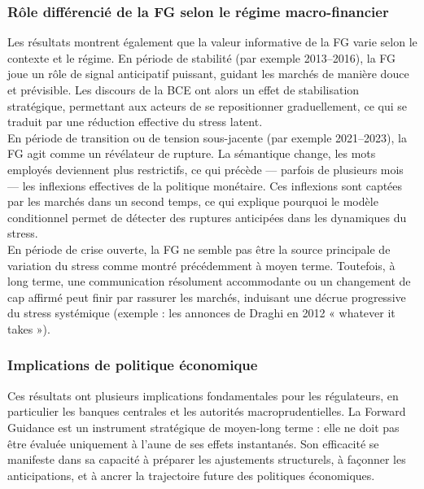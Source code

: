 \subsubsection{Rôle différencié de la FG selon le régime macro-financier}

Les résultats montrent également que la valeur informative de la FG varie selon le contexte et le régime. En période de stabilité (par exemple 2013–2016), la FG joue un rôle de signal anticipatif puissant, guidant les marchés de manière douce et prévisible. Les discours de la BCE ont alors un effet de stabilisation stratégique, permettant aux acteurs de se repositionner graduellement, ce qui se traduit par une réduction effective du stress latent.\\

En période de transition ou de tension sous-jacente (par exemple 2021–2023), la FG agit comme un révélateur de rupture. La sémantique change, les mots employés deviennent plus restrictifs, ce qui précède — parfois de plusieurs mois — les inflexions effectives de la politique monétaire. Ces inflexions sont captées par les marchés dans un second temps, ce qui explique pourquoi le modèle conditionnel permet de détecter des ruptures anticipées dans les dynamiques du stress.\\

En période de crise ouverte, la FG ne semble pas être la source principale de variation du stress comme montré précédemment à moyen terme. Toutefois, à long terme, une communication résolument accommodante ou un changement de cap affirmé peut finir par rassurer les marchés, induisant une décrue progressive du stress systémique (exemple : les annonces de Draghi en 2012 « whatever it takes »).

\subsubsection{Implications de politique économique}

Ces résultats ont plusieurs implications fondamentales pour les régulateurs, en particulier les banques centrales et les autorités macroprudentielles. La Forward Guidance est un instrument stratégique de moyen-long terme : elle ne doit pas être évaluée uniquement à l’aune de ses effets instantanés. Son efficacité se manifeste dans sa capacité à préparer les ajustements structurels, à façonner les anticipations, et à ancrer la trajectoire future des politiques économiques.\\

